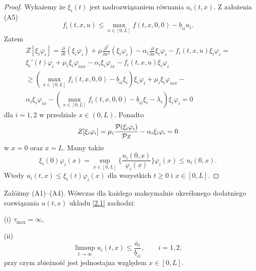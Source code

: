 	\begin{proof}
	Wykażemy że  $\xi_i(t)$ jest  nadrozwiązaniem równania $u_i(t,x)$. 
	Z założenia (A5) 
	\begin{equation}
		f_i(t,x,u) \le \max_{x\in [0,L]} f(t,x,0,0)  - \underline{b}_{ii}u_i.  
	\end{equation}
	Zatem
	\begin{equation}
		\begin{split}
			Z[\xi_i \varphi_i] = \frac{\partial }{\partial t }(\xi_i \varphi_i) +\mu \frac{\partial^2 }{\partial x^2}(\xi_i \varphi_i) -
			\alpha_i \frac{\partial }{\partial x}\xi_i \varphi_i- f_i(t,x,u)\xi_i \varphi_i =\\
			\xi_i'(t) \varphi_i +\mu_i \xi_i \varphi_{ixx} - \alpha_i \xi_i \varphi_{ix}
			- f_i(t,x,u) \xi_i \varphi_i\\
			\geq (\max_{x\in [0,L]} f_i(t,x,0,0) - \underline{b}_{ii}\xi_i )\xi_i \varphi_i  +\mu_i \xi_i \varphi_{ixx} - \\
			\alpha_i \xi_i \varphi_{ix} - (\max_{x\in [0,L]} f_i(t,x,0,0) - \underline{b}_{ii}\xi_i -\lambda_i )\xi_i \varphi_i =0
		\end{split} 
	\end{equation}
	dla $i=1,2$ w przedziale $x\in(0,L)$.
	Ponadto
	\begin{equation}
		Z[\xi_i \varphi_i]= \mu_i \frac{\mathcal{P}(\xi_i \varphi_i)}{\mathcal{P} x} - \alpha_i\xi_i \varphi_i =0 
	\end{equation}
	w $x=0$ oraz $x=L$.
	Mamy także
	\begin{equation}
		\xi_i(0)\varphi_i(x)=\sup_{x\in[0,L]}\{\frac{u_i(0,x)}{\varphi_i(x)}\}\varphi_i(x)\le u_i(0,x).
	\end{equation}
	Wtedy $u_i(t,x)\le \xi_i(t)\varphi_i(x)$ dla wszystkich $t\geq 0$ i $x\in [0,L]$.
	\end{proof}
	
	\begin{lemma}
		Załóżmy (A1)–(A4). Wówczas dla każdego maksymalnie określonego dodatniego rozwiązania $u(t,x)$ układu \eqref{2.1} zachodzi:
		
		(i) $\tau_{\max}=\infty$,
		
		(ii)
		\begin{equation}
		\limsup_{t\to\infty} u_i(t,x)\le \frac{\overline{a}_i}{\underline{b}_{ii}},\qquad i=1,2,
		\end{equation}
		przy czym zbieżność jest jednostajna względem $x\in[0,L]$.
	\end{lemma}
	
